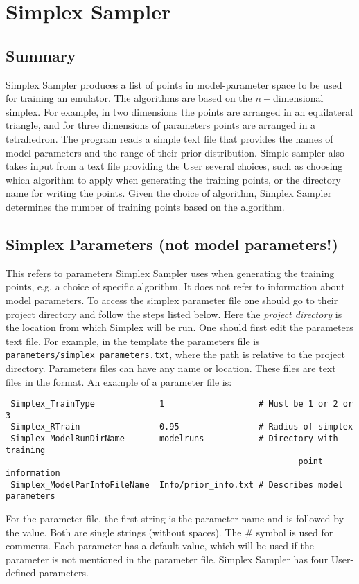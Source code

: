 \documentclass[main.tex]{subfiles}
\begin{document}
\newpage
\setcounter{section}{2}

\section{Simplex Sampler}

\subsection{Summary}
Simplex Sampler produces a list of points in model-parameter space to be used for training an emulator. The algorithms are based on the $n-$dimensional simplex. For example, in two dimensions the points are arranged in an equilateral triangle, and for three dimensions of parameters points are arranged in a tetrahedron. The program reads a simple text file that provides the names of model parameters and the range of their prior distribution. Simple sampler also takes input from a text file providing the User several choices, such as choosing which algorithm to apply when generating the training points, or the directory name for writing the points. Given the choice of algorithm, Simplex Sampler determines the number of training points based on the algorithm.

\subsection{Simplex Parameters (not model parameters!)}

This refers to parameters Simplex Sampler uses when generating the training points, e.g. a choice of specific algorithm. It does not refer to information about model parameters. To access the simplex parameter file one should go to their project directory and follow the steps listed below. Here the {\it project directory} is the location from which Simplex will be run. One should first edit the parameters text file. For example, in the template the parameters file is {\tt parameters/simplex\_parameters.txt}, where the path is relative to the project directory.
Parameters files can have any name or location. These files are text files in the format. An example of a parameter file is:\\
{\tt\begin{verbatim}
 Simplex_TrainType             1                   # Must be 1 or 2 or 3
 Simplex_RTrain                0.95                # Radius of simplex
 Simplex_ModelRunDirName       modelruns           # Directory with training
                                                           point information
 Simplex_ModelParInfoFileName  Info/prior_info.txt # Describes model parameters
\end{verbatim}
}
For the parameter file, the first string is the parameter name and is followed by the value. Both are single strings (without spaces). The \# symbol is used for comments. Each parameter has a default value, which will be used if the parameter is not mentioned in the parameter file.  Simplex Sampler has four User-defined parameters.
    
\end{document}
